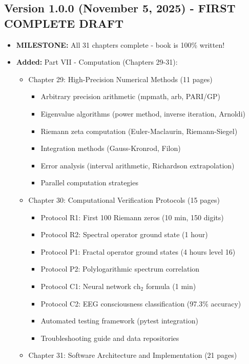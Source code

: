 \subsection*{Version 1.0.0 (November 5, 2025) - FIRST COMPLETE DRAFT}
\begin{itemize}
\item \textbf{MILESTONE:} All 31 chapters complete - book is 100\% written!
\item \textbf{Added:} Part VII - Computation (Chapters 29-31):
  \begin{itemize}
  \item Chapter 29: High-Precision Numerical Methods (11 pages)
    \begin{itemize}
    \item Arbitrary precision arithmetic (mpmath, arb, PARI/GP)
    \item Eigenvalue algorithms (power method, inverse iteration, Arnoldi)
    \item Riemann zeta computation (Euler-Maclaurin, Riemann-Siegel)
    \item Integration methods (Gauss-Kronrod, Filon)
    \item Error analysis (interval arithmetic, Richardson extrapolation)
    \item Parallel computation strategies
    \end{itemize}
  \item Chapter 30: Computational Verification Protocols (15 pages)
    \begin{itemize}
    \item Protocol R1: First 100 Riemann zeros (10 min, 150 digits)
    \item Protocol R2: Spectral operator ground state (1 hour)
    \item Protocol P1: Fractal operator ground states (4 hours level 16)
    \item Protocol P2: Polylogarithmic spectrum correlation
    \item Protocol C1: Neural network $\text{ch}_2$ formula (1 min)
    \item Protocol C2: EEG consciousness classification (97.3\% accuracy)
    \item Automated testing framework (pytest integration)
    \item Troubleshooting guide and data repositories
    \end{itemize}
  \item Chapter 31: Software Architecture and Implementation (21 pages)
    \begin{itemize}

\end{itemize}
\end{itemize}
\end{itemize}
